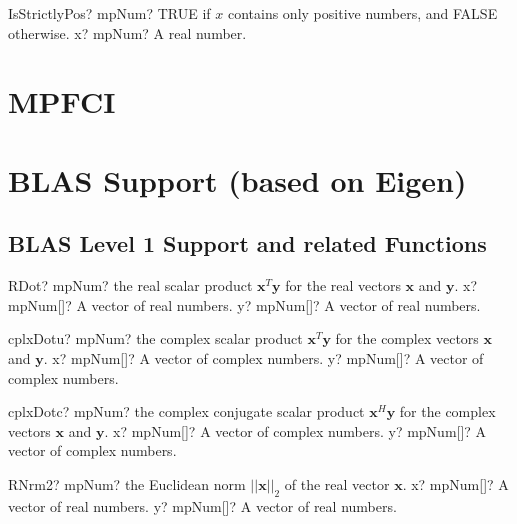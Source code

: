 \documentclass[12pt,a4paper,openany]{book}
\begin{document}
\begin{mpFunctionsExtract}
\mpFunctionOne
{IsStrictlyPos? mpNum? TRUE if $x$ contains only positive numbers, and FALSE otherwise.}
{x? mpNum? A real number.}
\end{mpFunctionsExtract}

\chapter{MPFCI}

\chapter{BLAS Support (based on Eigen)}

\section{BLAS Level 1 Support and related Functions}

\begin{mpFunctionsExtract}
\mpFunctionTwo
{RDot? mpNum? the real scalar product $\boldsymbol{x}^T \boldsymbol{y}$ for the real vectors $\boldsymbol{x}$ and $\boldsymbol{y}$.}
{x? mpNum[]? A vector of real numbers.}
{y? mpNum[]? A vector of real numbers.}
\end{mpFunctionsExtract}

\begin{mpFunctionsExtract}
\mpFunctionTwo
{cplxDotu? mpNum? the complex  scalar product $\boldsymbol{x}^T \boldsymbol{y}$ for the complex  vectors $\boldsymbol{x}$ and $\boldsymbol{y}$.}
{x? mpNum[]? A vector of complex numbers.}
{y? mpNum[]? A vector of complex numbers.}
\end{mpFunctionsExtract}

\begin{mpFunctionsExtract}
\mpFunctionTwo
{cplxDotc? mpNum? the complex conjugate scalar product $\boldsymbol{x}^H \boldsymbol{y}$ for the complex  vectors $\boldsymbol{x}$ and $\boldsymbol{y}$.}
{x? mpNum[]? A vector of complex numbers.}
{y? mpNum[]? A vector of complex numbers.}
\end{mpFunctionsExtract}

\begin{mpFunctionsExtract}
\mpFunctionTwo
{RNrm2? mpNum? the Euclidean norm $||\boldsymbol{x}||_2$ of the real vector $\boldsymbol{x}$.}
{x? mpNum[]? A vector of real numbers.}
{y? mpNum[]? A vector of real numbers.}
\end{mpFunctionsExtract}
\end{document}

